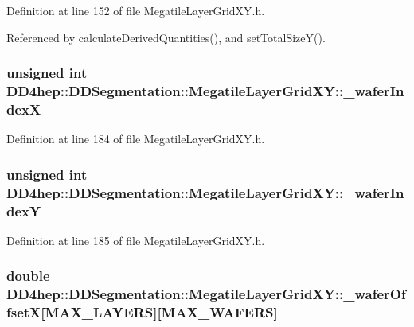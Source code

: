 Definition at line 152 of file MegatileLayerGridXY.h.

Referenced by calculateDerivedQuantities(), and setTotalSizeY().\hypertarget{class_d_d4hep_1_1_d_d_segmentation_1_1_megatile_layer_grid_x_y_ae5d63f80a247fc98ec77fea73d93be60}{
\subsubsection[{\_\-waferIndexX}]{\setlength{\rightskip}{0pt plus 5cm}unsigned int {\bf DD4hep::DDSegmentation::MegatileLayerGridXY::\_\-waferIndexX}}}
\label{class_d_d4hep_1_1_d_d_segmentation_1_1_megatile_layer_grid_x_y_ae5d63f80a247fc98ec77fea73d93be60}


Definition at line 184 of file MegatileLayerGridXY.h.\hypertarget{class_d_d4hep_1_1_d_d_segmentation_1_1_megatile_layer_grid_x_y_a42e3bd719291c17dafe836762a6d7f02}{
\subsubsection[{\_\-waferIndexY}]{\setlength{\rightskip}{0pt plus 5cm}unsigned int {\bf DD4hep::DDSegmentation::MegatileLayerGridXY::\_\-waferIndexY}}}
\label{class_d_d4hep_1_1_d_d_segmentation_1_1_megatile_layer_grid_x_y_a42e3bd719291c17dafe836762a6d7f02}


Definition at line 185 of file MegatileLayerGridXY.h.\hypertarget{class_d_d4hep_1_1_d_d_segmentation_1_1_megatile_layer_grid_x_y_a631f3f1389a8cf6f1f83489aa788d558}{
\subsubsection[{\_\-waferOffsetX}]{\setlength{\rightskip}{0pt plus 5cm}double {\bf DD4hep::DDSegmentation::MegatileLayerGridXY::\_\-waferOffsetX}\mbox{[}MAX\_\-LAYERS\mbox{]}\mbox{[}MAX\_\-WAFERS\mbox{]}}}
\label{class_d_d4hep_1_1_d_d_segmentation_1_1_megatile_layer_grid_x_y_a631f3f1389a8cf6f1f83489aa788d558}


